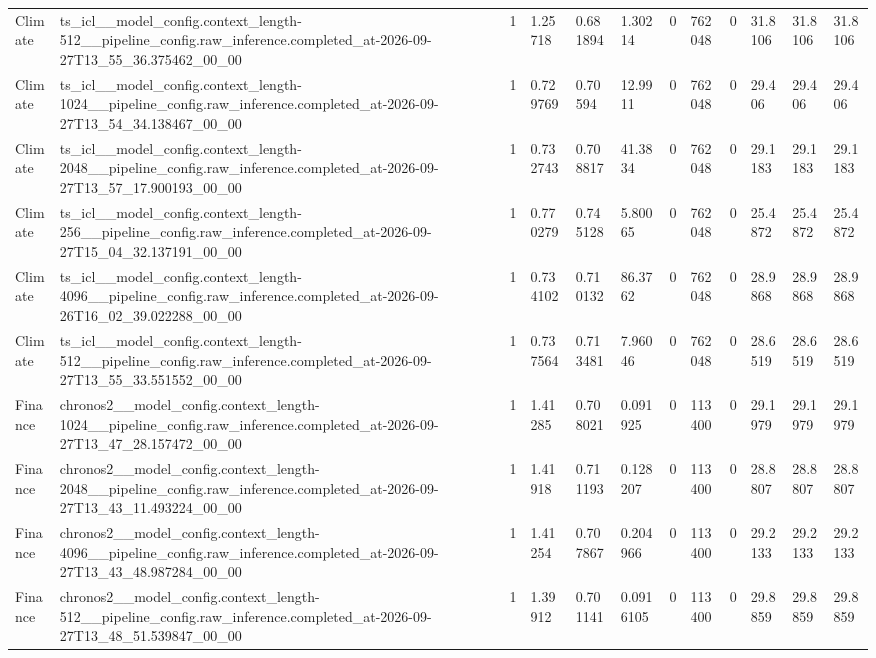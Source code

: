 \begin{tabular}{llllllllllll}
Climate & ts\_icl\_\_model\_config.context\_length-512\_\_pipeline\_config.raw\_inference.completed\_at-2026-09-27T13\_55\_36.375462\_00\_00 & 1 & 1.25718 & 0.681894 & 1.30214 & 0 & 762048 & 0 & 31.8106 & 31.8106 & 31.8106 \\
Climate & ts\_icl\_\_model\_config.context\_length-1024\_\_pipeline\_config.raw\_inference.completed\_at-2026-09-27T13\_54\_34.138467\_00\_00 & 1 & 0.729769 & 0.70594 & 12.9911 & 0 & 762048 & 0 & 29.406 & 29.406 & 29.406 \\
Climate & ts\_icl\_\_model\_config.context\_length-2048\_\_pipeline\_config.raw\_inference.completed\_at-2026-09-27T13\_57\_17.900193\_00\_00 & 1 & 0.732743 & 0.708817 & 41.3834 & 0 & 762048 & 0 & 29.1183 & 29.1183 & 29.1183 \\
Climate & ts\_icl\_\_model\_config.context\_length-256\_\_pipeline\_config.raw\_inference.completed\_at-2026-09-27T15\_04\_32.137191\_00\_00 & 1 & 0.770279 & 0.745128 & 5.80065 & 0 & 762048 & 0 & 25.4872 & 25.4872 & 25.4872 \\
Climate & ts\_icl\_\_model\_config.context\_length-4096\_\_pipeline\_config.raw\_inference.completed\_at-2026-09-26T16\_02\_39.022288\_00\_00 & 1 & 0.734102 & 0.710132 & 86.3762 & 0 & 762048 & 0 & 28.9868 & 28.9868 & 28.9868 \\
Climate & ts\_icl\_\_model\_config.context\_length-512\_\_pipeline\_config.raw\_inference.completed\_at-2026-09-27T13\_55\_33.551552\_00\_00 & 1 & 0.737564 & 0.713481 & 7.96046 & 0 & 762048 & 0 & 28.6519 & 28.6519 & 28.6519 \\
Finance & chronos2\_\_model\_config.context\_length-1024\_\_pipeline\_config.raw\_inference.completed\_at-2026-09-27T13\_47\_28.157472\_00\_00 & 1 & 1.41285 & 0.708021 & 0.091925 & 0 & 113400 & 0 & 29.1979 & 29.1979 & 29.1979 \\
Finance & chronos2\_\_model\_config.context\_length-2048\_\_pipeline\_config.raw\_inference.completed\_at-2026-09-27T13\_43\_11.493224\_00\_00 & 1 & 1.41918 & 0.711193 & 0.128207 & 0 & 113400 & 0 & 28.8807 & 28.8807 & 28.8807 \\
Finance & chronos2\_\_model\_config.context\_length-4096\_\_pipeline\_config.raw\_inference.completed\_at-2026-09-27T13\_43\_48.987284\_00\_00 & 1 & 1.41254 & 0.707867 & 0.204966 & 0 & 113400 & 0 & 29.2133 & 29.2133 & 29.2133 \\
Finance & chronos2\_\_model\_config.context\_length-512\_\_pipeline\_config.raw\_inference.completed\_at-2026-09-27T13\_48\_51.539847\_00\_00 & 1 & 1.39912 & 0.701141 & 0.0916105 & 0 & 113400 & 0 & 29.8859 & 29.8859 & 29.8859 \\

\end{tabular}
